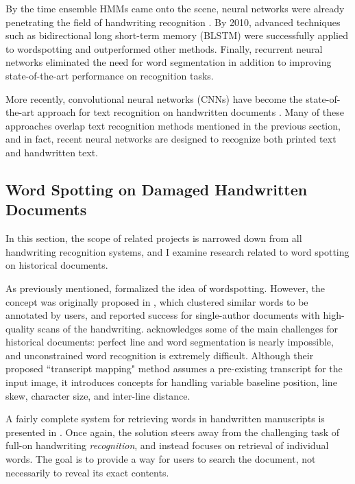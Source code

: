 \documentclass[final]{ukthesis}
\begin{document}
By the time ensemble HMMs came onto the scene, neural networks were already penetrating the field of handwriting recognition \cite{fernandez2007application}. By 2010, advanced techniques such as bidirectional long short-term memory (BLSTM) were successfully applied to wordspotting \cite{wang2010word} and outperformed other methods. Finally, recurrent neural networks \cite{frinken2012novel} eliminated the need for word segmentation in addition to improving state-of-the-art performance on recognition tasks.

More recently, convolutional neural networks (CNNs) have become the state-of-the-art approach for text recognition on handwritten documents \cite{zhong2016spottingnet,sudholt2016phocnet}. Many of these approaches overlap text recognition methods mentioned in the previous section, and in fact, recent neural networks are designed to recognize both printed text and handwritten text.

\subsection{Word Spotting on Damaged Handwritten Documents}
In this section, the scope of related projects is narrowed down from all handwriting recognition systems, and I examine research related to word spotting on historical documents.

As previously mentioned, \cite{rath2007word} formalized the idea of wordspotting. However, the concept was originally proposed in \cite{manmatha1996word}, which clustered similar words to be annotated by users, and reported success for single-author documents with high-quality scans of the handwriting. \cite{tomai2002transcript} acknowledges some of the main challenges for historical documents: perfect line and word segmentation is nearly impossible, and unconstrained word recognition is extremely difficult. Although their proposed ``transcript mapping" method assumes a pre-existing transcript for the input image, it introduces concepts for handling variable baseline position, line skew, character size, and inter-line distance.

A fairly complete system for retrieving words in handwritten manuscripts is presented in \cite{rath2004search}. Once again, the solution steers away from the challenging task of full-on handwriting {\em recognition}, and instead focuses on retrieval of individual words. The goal is to provide a way for users to search the document, not necessarily to reveal its exact contents.
\end{document}
